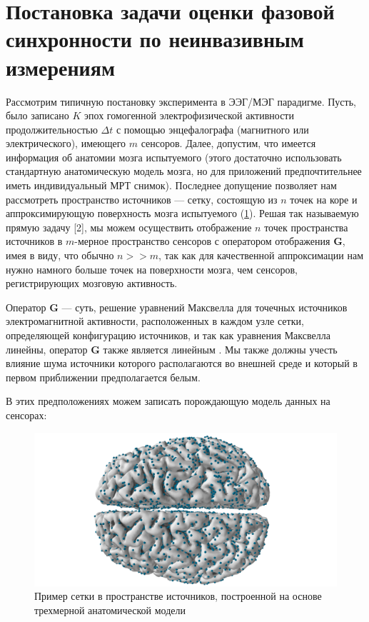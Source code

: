 \section{Постановка задачи оценки фазовой синхронности по неинвазивным измерениям}\label{sect1_1}


Рассмотрим типичную постановку эксперимента в ЭЭГ/МЭГ парадигме.
Пусть, было записано $K$ эпох гомогенной электрофизической
активности продолжительностью $\Delta t$ с помощью энцефалографа (магнитного или электрического),
имеющего $m$ сенсоров.
Далее, допустим, что имеется информация об анатомии мозга испытуемого (этого достаточно
использовать стандартную анатомическую модель мозга,
но для приложений предпочтительнее иметь индивидуальный МРТ снимок).
Последнее допущение позволяет нам рассмотреть пространство источников --- сетку,
состоящую из $n$ точек на коре и аппроксимирующую поверхность мозга испытуемого (\ref{fig:src_space}).
Решая так называемую прямую задачу [2], мы можем осуществить отображение $n$ точек пространства
источников в $m$-мерное пространство сенсоров с оператором отображения $\mathbf{G}$, имея в виду, что
обычно $n >> m$, так как для качественной аппроксимации нам нужно намного
больше точек на поверхности мозга, чем сенсоров, регистрирующих мозговую активность.

Оператор $\mathbf{G}$ --- суть, решение уравнений Максвелла для точечных источников электромагнитной активности,
расположенных в каждом узле сетки, определяющей конфигурацию источников,
и так как уравнения Максвелла линейны, оператор $\mathbf{G}$ также является линейным \cite{Hamalainen1993}.
Мы также должны учесть влияние шума источники которого располагаются во внешней среде
и который в первом приближении предполагается белым.

В этих предположениях можем записать порождающую модель данных на сенсорах:

\begin{figure}
\centering
\includegraphics[scale=0.3]{../images/brain.png}
\caption{Пример сетки в пространстве источников,
          построенной на основе трехмерной анатомической модели}
\label{fig:src_space}
\end{figure}

